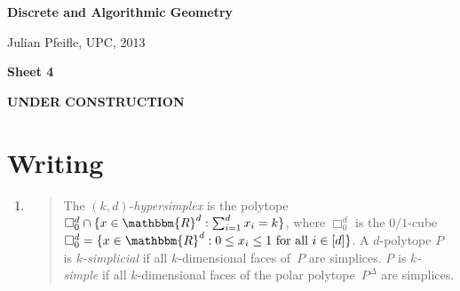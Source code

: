 \documentclass[11pt]{amsart}
\newcommand{\R}{\mathbbm{R}}
\begin{document}
\begin{center}
\textbf{\sffamily
   Discrete and Algorithmic Geometry }

\medskip
   Julian Pfeifle,
   UPC, 2013 \mbox{}
\end{center}

\bigskip

\begin{center}
  \textbf{\sffamily Sheet 4}

\bigskip
\textbf{\sffamily UNDER CONSTRUCTION}

\end{center}

\bigskip



\section*{Writing}

\begin{enumerate}
\setlength{\itemsep}{2ex}
\item

  \begin{quote}\small
    The $(k,d)$-\emph{hypersimplex} is the polytope
    $\Box_0^d\cap\{x\in\R^d:\sum_{i=1}^d x_i = k\}$, where $\Box_0^d$
    is the $0/1$-cube $\Box_0^d = \{x\in\R^d: 0\le x_i\le 1\text{ for
      all }i\in[d]\}$. 
    A $d$-polytope $P$ is \emph{$k$-simplicial} if all $k$-dimensional faces of~$P$ are simplices. 
$P$ is \emph{$k$-simple} if all $k$-dimensional faces of the polar polytope~$P^\Delta$ are simplices. 
  \end{quote}
\end{enumerate}

\end{document}
